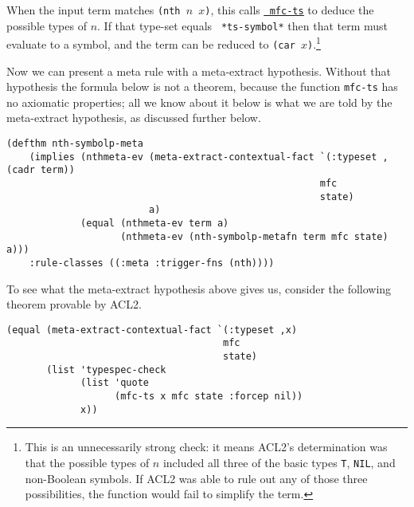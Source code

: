 \noindent When the input term matches {\tt (nth $n$ $x$)}, this calls
\href{http://www.cs.utexas.edu/users/moore/acl2/manuals/current/manual/index.html?topic=ACL2\_\_\_\_MFC-TS}{\underline{\tt
    mfc-ts}}
to deduce the possible types of $n$.  If that type-set equals {\tt
  *ts-symbol*} then that term must evaluate to a symbol, and the term
can be reduced to {\tt (car $x$)}.\footnote{This is an unnecessarily strong check: it means ACL2's determination
was that the possible types of $n$ included all three of the basic
types {\tt T}, {\tt NIL}, and non-Boolean symbols.  If ACL2 was able
to rule out any of those three possibilities, the function would
fail to simplify the term.}

Now we can present a meta rule with a meta-extract
hypothesis.  Without that hypothesis the formula below is
not a theorem, because the function {\tt mfc-ts} has no axiomatic
properties; all we know about it below is what we are told by the
meta-extract hypothesis, as discussed further below.

\begin{verbatim}
(defthm nth-symbolp-meta
    (implies (nthmeta-ev (meta-extract-contextual-fact `(:typeset ,(cadr term))
                                                       mfc
                                                       state)
                         a)
             (equal (nthmeta-ev term a)
                    (nthmeta-ev (nth-symbolp-metafn term mfc state) a)))
    :rule-classes ((:meta :trigger-fns (nth))))
\end{verbatim}

\noindent To see what the meta-extract hypothesis above gives us, consider the
following theorem provable by ACL2.

\begin{verbatim}
(equal (meta-extract-contextual-fact `(:typeset ,x)
                                      mfc
                                      state)
       (list 'typespec-check
             (list 'quote
                   (mfc-ts x mfc state :forcep nil))
             x))
\end{verbatim}

